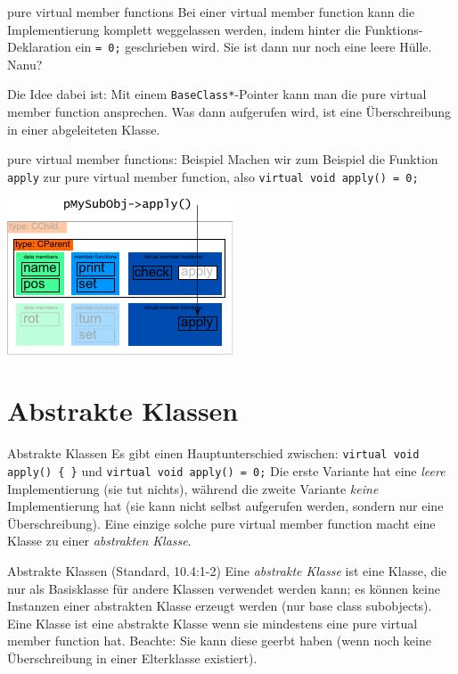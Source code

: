 \begin{frame}[fragile]{pure virtual member functions}
	Bei einer virtual member function kann die Implementierung komplett weggelassen werden, indem hinter die Funktions-Deklaration ein \verb|= 0;| geschrieben wird. Sie ist dann nur noch eine leere Hülle. Nanu?
	
	\pause
	\vspace{1em}
	
	Die Idee dabei ist: Mit einem \verb|BaseClass*|-Pointer kann man die pure virtual member function ansprechen. Was dann aufgerufen wird, ist eine Überschreibung in einer abgeleiteten Klasse.
\end{frame}

\begin{frame}[fragile,b]{pure virtual member functions: Beispiel}
	Machen wir zum Beispiel die Funktion \verb|apply| zur pure virtual member function, also \verb|virtual void apply() = 0;|
	
	\vspace{1em}
	\includegraphics[width=0.5\linewidth]{images/pMySubObj-pureVirtApply}
\end{frame}


\section{Abstrakte Klassen}

\begin{frame}[fragile]{Abstrakte Klassen}
	Es gibt einen Hauptunterschied zwischen:
	\verb|virtual void apply() { }|
	und
	\verb|virtual void apply() = 0;|
	Die erste Variante hat eine \emph{leere} Implementierung (sie tut nichts), während die zweite Variante \emph{keine} Implementierung hat (sie kann nicht selbst aufgerufen werden, sondern nur eine Überschreibung).
	Eine einzige solche pure virtual member function macht eine Klasse zu einer \emph{abstrakten Klasse}.
	
	\pause
	
	\begin{block}{Abstrakte Klassen (Standard, 10.4:1-2)}
		Eine \emph{abstrakte Klasse} ist eine Klasse, die nur als Basisklasse für andere Klassen verwendet werden kann; es können keine Instanzen einer abstrakten Klasse erzeugt werden (nur base class subobjects). Eine Klasse ist eine abstrakte Klasse wenn sie mindestens eine pure virtual member function hat. Beachte: Sie kann diese geerbt haben (wenn noch keine Überschreibung in einer Elterklasse existiert).
	\end{block}
\end{frame}

